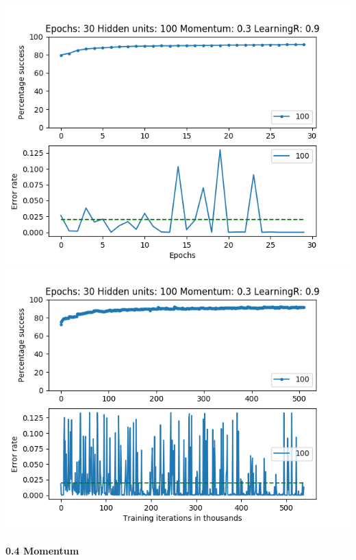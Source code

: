 \documentclass[11pt]{article}
\makeatletter
\def\maxwidth{\ifdim\Gin@nat@width>\linewidth\linewidth
    \else\Gin@nat@width\fi}
\let\Oldincludegraphics\includegraphics
\renewcommand{\includegraphics}[1]{\Oldincludegraphics[width=.8\maxwidth]{#1}}
\makeatother
\begin{document}
\includegraphics{Experiment2/E2_NN_Epoch_Momentum_0.3_30Epochs_100Hiddenunits.png}
\includegraphics{Experiment2/E2_NN_Training_Momentum_0.3_30Epochs_100Hiddenunits.png}

\hypertarget{momentum-4}{%
\paragraph{0.4 Momentum}\label{momentum-4}}
\end{document}
